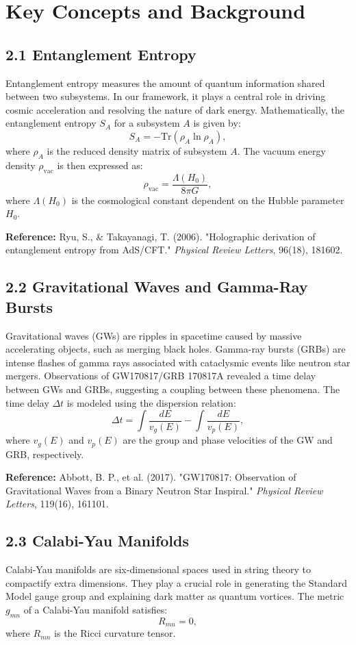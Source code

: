 \documentclass[12pt,a4paper]{article}
\begin{document}
\section*{Key Concepts and Background}

\subsection*{2.1 Entanglement Entropy}
Entanglement entropy measures the amount of quantum information shared between two subsystems. In our framework, it plays a central role in driving cosmic acceleration and resolving the nature of dark energy. Mathematically, the entanglement entropy $S_A$ for a subsystem $A$ is given by:
$$
S_A = -\text{Tr}(\rho_A \ln \rho_A),
$$
where $\rho_A$ is the reduced density matrix of subsystem $A$. The vacuum energy density $\rho_{\text{vac}}$ is then expressed as:
$$
\rho_{\text{vac}} = \frac{\Lambda(H_0)}{8\pi G},
$$
where $\Lambda(H_0)$ is the cosmological constant dependent on the Hubble parameter $H_0$.

\textbf{Reference:} Ryu, S., \& Takayanagi, T. (2006). "Holographic derivation of entanglement entropy from AdS/CFT." \textit{Physical Review Letters}, 96(18), 181602.

\subsection*{2.2 Gravitational Waves and Gamma-Ray Bursts}
Gravitational waves (GWs) are ripples in spacetime caused by massive accelerating objects, such as merging black holes. Gamma-ray bursts (GRBs) are intense flashes of gamma rays associated with cataclysmic events like neutron star mergers. Observations of GW170817/GRB 170817A revealed a time delay between GWs and GRBs, suggesting a coupling between these phenomena. The time delay $\Delta t$ is modeled using the dispersion relation:
$$
\Delta t = \int \frac{dE}{v_g(E)} - \int \frac{dE}{v_p(E)},
$$
where $v_g(E)$ and $v_p(E)$ are the group and phase velocities of the GW and GRB, respectively.

\textbf{Reference:} Abbott, B. P., et al. (2017). "GW170817: Observation of Gravitational Waves from a Binary Neutron Star Inspiral." \textit{Physical Review Letters}, 119(16), 161101.

\subsection*{2.3 Calabi-Yau Manifolds}
Calabi-Yau manifolds are six-dimensional spaces used in string theory to compactify extra dimensions. They play a crucial role in generating the Standard Model gauge group and explaining dark matter as quantum vortices. The metric $g_{mn}$ of a Calabi-Yau manifold satisfies:
$$
R_{mn} = 0,
$$
where $R_{mn}$ is the Ricci curvature tensor.
\end{document}
